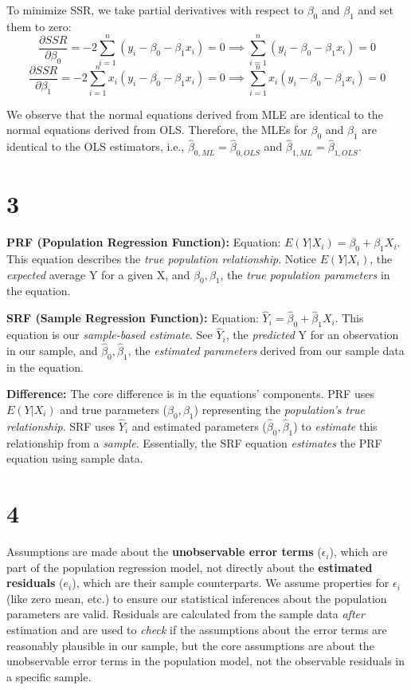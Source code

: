 To minimize SSR, we take partial derivatives with respect to \(\beta_0\)
and \(\beta_1\) and set them to zero:
\[\frac{\partial SSR}{\partial\beta_0} = -2 \sum_{i=1}^{n} (y_i - \beta_0 - \beta_1x_i) = 0  \implies  \sum_{i=1}^{n} (y_i - \beta_0 - \beta_1x_i) = 0\]
\[\frac{\partial SSR}{\partial\beta_1} = -2 \sum_{i=1}^{n} x_i (y_i - \beta_0 - \beta_1x_i) = 0  \implies  \sum_{i=1}^{n} x_i (y_i - \beta_0 - \beta_1x_i) = 0\]

We observe that the normal equations derived from MLE are identical to
the normal equations derived from OLS. Therefore, the MLEs for
\(\beta_0\) and \(\beta_1\) are identical to the OLS estimators, i.e.,
\(\hat{\beta}_{0,ML} = \hat{\beta}_{0,OLS}\) and
\(\hat{\beta}_{1,ML} = \hat{\beta}_{1,OLS}\).

    \section{3}\label{section}

    \textbf{PRF (Population Regression Function):} Equation:
\(E(Y | X_i) = \beta_0 + \beta_1X_i\). This equation describes the
\emph{true population relationship}. Notice \(E(Y|X_i)\), the
\emph{expected} average Y for a given X, and \(\beta_0, \beta_1\), the
\emph{true population parameters} in the equation.

\textbf{SRF (Sample Regression Function):} Equation:
\(\hat{Y}_i =  \hat{\beta}_0 + \hat{\beta}_1X_i\). This equation is our
\emph{sample-based estimate}. See \(\hat{Y}_i\), the \emph{predicted} Y
for an observation in our sample, and \(\hat{\beta}_0, \hat{\beta}_1\),
the \emph{estimated parameters} derived from our sample data in the
equation.

\textbf{Difference:} The core difference is in the equations'
components. PRF uses \(E(Y|X_i)\) and true parameters
(\(\beta_0, \beta_1\)) representing the \emph{population's true
relationship}. SRF uses \(\hat{Y}_i\) and estimated parameters
(\(\hat{\beta}_0, \hat{\beta}_1\)) to \emph{estimate} this relationship
from a \emph{sample}. Essentially, the SRF equation \emph{estimates} the
PRF equation using sample data.

    \section{4}\label{section}

    Assumptions are made about the \textbf{unobservable error terms}
(\(\epsilon_i\)), which are part of the population regression model, not
directly about the \textbf{estimated residuals} (\(e_i\)), which are
their sample counterparts. We assume properties for \(\epsilon_i\) (like
zero mean, etc.) to ensure our statistical inferences about the
population parameters are valid. Residuals are calculated from the
sample data \emph{after} estimation and are used to \emph{check} if the
assumptions about the error terms are reasonably plausible in our
sample, but the core assumptions are about the unobservable error terms
in the population model, not the observable residuals in a specific
sample.

